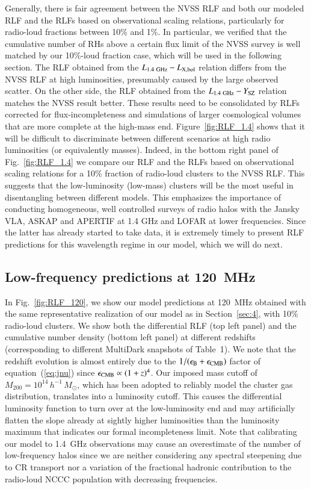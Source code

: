 \documentclass[useAMS,usenatbib]{mn2e}
\begin{document}
Generally, there is fair agreement between the NVSS RLF and both our modeled RLF
and the RLFs based on observational scaling relations, particularly for
radio-loud fractions between 10\% and 1\%. In particular, we verified that the
cumulative number of RHs above a certain flux limit of the NVSS survey is well
matched by our 10\%-loud fraction case, which will be used in the following
section.  The RLF obtained from the $L_{1.4~{\mathrm{GHz}}}-L_{{\mathrm{X,bol}}}$ relation
differs from the NVSS RLF at high luminosities, presumably caused by the large
observed scatter.  On the other side, the RLF obtained from the
$L_{1.4~{\mathrm{GHz}}}-Y_{{\mathrm{SZ}}}$ relation matches the NVSS result better. These
results need to be consolidated by RLFs corrected for flux-incompleteness and
simulations of larger cosmological volumes that are more complete at the
high-mass end. Figure~\ref{fig:RLF_1.4} shows that it will be difficult to
discriminate between different scenarios at high radio luminosities (or
equivalently masses). Indeed, in the bottom right panel of
Fig.~\ref{fig:RLF_1.4} we compare our RLF and the RLFs based on observational
scaling relations for a 10\% fraction of radio-loud clusters to the NVSS
RLF. This suggests that the low-luminosity (low-mass) clusters will be the most
useful in disentangling between different models. This emphasizes the importance
of conducting homogeneous, well controlled surveys of radio halos with the
Jansky VLA, ASKAP \citep{2011PASA...28..215N} and APERTIF
\citep{2012JApA..tmp...34R} at 1.4 GHz and LOFAR at lower frequencies. Since the
latter has already started to take data, it is extremely timely to present RLF
predictions for this wavelength regime in our model, which we will do next.


\subsection{Low-frequency predictions at 120~MHz}

In Fig.~\ref{fig:RLF_120}, we show our model predictions at 120~MHz obtained
with the same representative realization of our model as in Section~\ref{sec:4},
with 10\% radio-loud clusters. We show both the differential RLF (top left
panel) and the cumulative number density (bottom left panel) at different
redshifts (corresponding to different MultiDark snapshots of Table~1).  We note
that the redshift evolution is almost entirely due to the
$1/(\epsilon_{{\mathrm{B}}}+\epsilon_{{\mathrm{CMB}}})$ factor of equation~(\ref{eq:jnu})
since $\epsilon_{\mathrm{CMB}}\propto (1+z)^4$.  Our imposed mass cutoff of
$M_{200}=10^{14}\,h^{-1}\,M_\odot$, which has been adopted to reliably model the
cluster gas distribution, translates into a luminosity cutoff. This causes the
differential luminosity function to turn over at the low-luminosity end and may
artificially flatten the slope already at sightly higher luminosities than the
luminosity maximum that indicates our formal incompleteness limit.  Note that
calibrating our model to 1.4~GHz observations may cause an overestimate of the
number of low-frequency halos since we are neither considering any spectral
steepening due to CR transport nor a variation of the fractional hadronic
contribution to the radio-loud NCCC population with decreasing frequencies.
\end{document}

